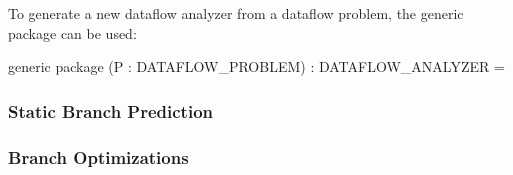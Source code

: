 To generate a new dataflow analyzer from a dataflow problem, 
the generic package  can be used:
\begin{SML}
 generic package (P : DATAFLOW_PROBLEM) : DATAFLOW_ANALYZER =
\end{SML}

\subsubsection{Static Branch Prediction} 

\subsubsection{Branch Optimizations}
